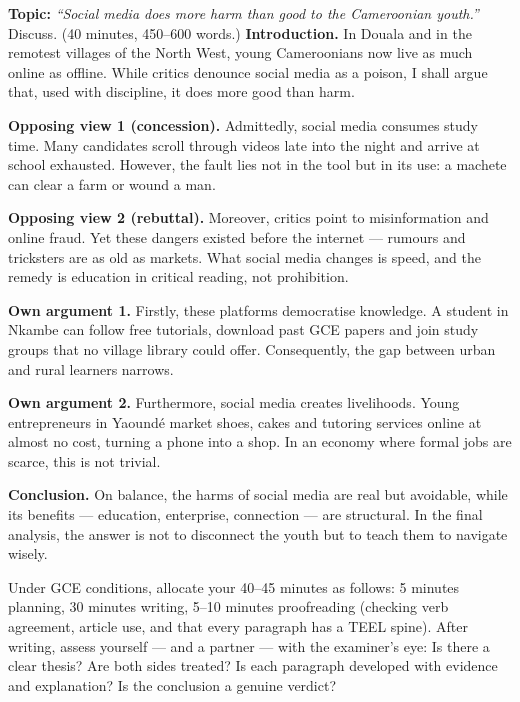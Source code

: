 \documentclass[11pt]{article}
\newcounter{popsec}
\newcounter{popsub}
\newcommand{\courssub}[1]{%
  \stepcounter{popsub}%
  \par\vspace{9pt}\noindent{\popxbold\fontsize{11.5}{13}\selectfont\color{popink}{\color{poporange}\thepopsec.\thepopsub}\hspace{6pt}#1}\par\nopagebreak\vspace{4pt}
}
\begin{document}
\begin{exoresolu}
\textbf{Topic:} \emph{``Social media does more harm than good to the Cameroonian youth.''} Discuss. (40 minutes, 450--600 words.)
\tcblower
\textbf{Introduction.} In Douala and in the remotest villages of the North West, young Cameroonians now live as much online as offline. While critics denounce social media as a poison, I shall argue that, used with discipline, it does more good than harm.

\textbf{Opposing view 1 (concession).} Admittedly, social media consumes study time. Many candidates scroll through videos late into the night and arrive at school exhausted. However, the fault lies not in the tool but in its use: a machete can clear a farm or wound a man.

\textbf{Opposing view 2 (rebuttal).} Moreover, critics point to misinformation and online fraud. Yet these dangers existed before the internet --- rumours and tricksters are as old as markets. What social media changes is speed, and the remedy is education in critical reading, not prohibition.

\textbf{Own argument 1.} Firstly, these platforms democratise knowledge. A student in Nkambe can follow free tutorials, download past GCE papers and join study groups that no village library could offer. Consequently, the gap between urban and rural learners narrows.

\textbf{Own argument 2.} Furthermore, social media creates livelihoods. Young entrepreneurs in Yaound\'e market shoes, cakes and tutoring services online at almost no cost, turning a phone into a shop. In an economy where formal jobs are scarce, this is not trivial.

\textbf{Conclusion.} On balance, the harms of social media are real but avoidable, while its benefits --- education, enterprise, connection --- are structural. In the final analysis, the answer is not to disconnect the youth but to teach them to navigate wisely.
\end{exoresolu}

\courssub{Timed Practice and Assessment}

Under GCE conditions, allocate your 40--45 minutes as follows: 5 minutes planning, 30 minutes writing, 5--10 minutes proofreading (checking verb agreement, article use, and that every paragraph has a TEEL spine). After writing, assess yourself --- and a partner --- with the examiner's eye: Is there a clear thesis? Are both sides treated? Is each paragraph developed with evidence and explanation? Is the conclusion a genuine verdict?
\end{document}
